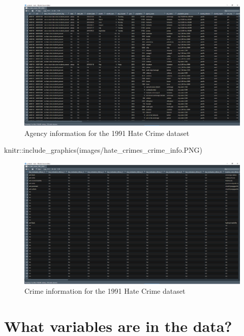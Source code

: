 \documentclass[
  12pt,
  openany]{book}
\newenvironment{Shaded}{\begin{snugshade}}{\end{snugshade}}
\newcommand{\FunctionTok}[1]{\textcolor[rgb]{0,0,0}{#1}}
\newcommand{\NormalTok}[1]{#1}
\newcommand{\SpecialCharTok}[1]{\textcolor[rgb]{0,0,0}{#1}}
\newcommand{\StringTok}[1]{\textcolor[rgb]{0.5,0.5,0.5}{#1}}
\begin{document}
\begin{figure}
\includegraphics[width=26.62in]{images/hate_crimes_agency_info} \caption{Agency information for the 1991 Hate Crime dataset}\label{fig:unnamed-chunk-2}
\end{figure}

\begin{Shaded}
\begin{Highlighting}[]
\NormalTok{knitr}\SpecialCharTok{::}\FunctionTok{include\_graphics}\NormalTok{(}\StringTok{\textquotesingle{}images/hate\_crimes\_crime\_info.PNG\textquotesingle{}}\NormalTok{)}
\end{Highlighting}
\end{Shaded}

\begin{figure}
\includegraphics[width=26.62in]{images/hate_crimes_crime_info} \caption{Crime information for the 1991 Hate Crime dataset}\label{fig:unnamed-chunk-3}
\end{figure}

\hypertarget{what-variables-are-in-the-data-4}{%
\section{What variables are in the data?}\label{what-variables-are-in-the-data-4}}
\end{document}
